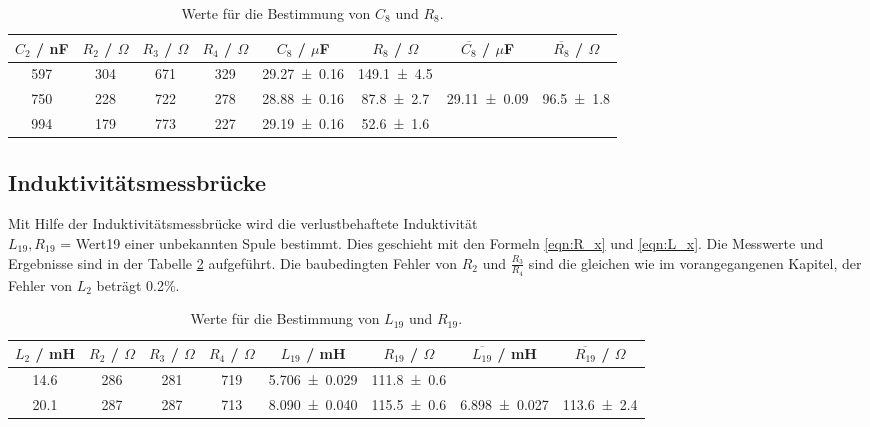 \begin{table}[H] %
  \centering
  \begin{tabular}{c c c c c c c c}
    \toprule
    $C_2$ / nF & $R_2$ / $\Omega$ & $R_3$ / $\Omega$ & $R_4$ / $\Omega$ & $C_8$ / $\mu$F & $R_8$ / $\Omega$ & $\overline{C_8}$ / $\mu$F & $\overline{R_8}$ / $\Omega$ \\
    \midrule
    597 & 304 & 671 & 329 & \num{29.27 +- 0.16} & \num{149.1 +- 4.5} & & \\
    750 & 228 & 722 & 278 & \num{28.88 +- 0.16} & \num{87.8 +- 2.7} & \num{29.11 +- 0.09} & \num{96.5 +- 1.8} \\
    994 & 179 & 773 & 227 & \num{29.19 +- 0.16} & \num{52.6 +- 1.6} & & \\
  \end{tabular}
  \caption{Werte für die Bestimmung von $C_8$ und $R_8$.}
  \label{tab:Kapa3}
\end{table}

\subsection{Induktivitätsmessbrücke}
\label{sec:Induk}
Mit Hilfe der Induktivitätsmessbrücke wird die verlustbehaftete Induktivität \\ $L_{19}, R_{19}$ = Wert19 einer unbekannten Spule bestimmt. Dies geschieht mit den Formeln \ref{eqn:R_x} und \ref{eqn:L_x}. Die Messwerte und Ergebnisse sind in der Tabelle \ref{tab:Induk1} aufgeführt. Die baubedingten Fehler von $R_2$ und $\frac{R_3}{R_4}$ sind die gleichen wie im vorangegangenen Kapitel, der Fehler von $L_2$ beträgt 0.2\%.

\begin{table}[H] %
  \centering
  \begin{tabular}{c c c c c c c c}
    \toprule
    $L_2$ / mH & $R_2$ / $\Omega$ & $R_3$ / $\Omega$ & $R_4$ / $\Omega$ & $L_{19}$ / mH & $R_{19}$ / $\Omega$ & $\overline{L_{19}}$ / mH & $\overline{R_{19}}$ / $\Omega$ \\
    \midrule
    14.6 & 286 & 281 & 719 & \num{5.706 +- 0.029} & \num{111.8 +- 0.6} & & \\
    20.1 & 287 & 287 & 713 & \num{8.090 +- 0.040} & \num{115.5 +- 0.6} & \num{6.898 +- 0.027} & \num{113.6 +- 2.4} \\
  \end{tabular}
  \caption{Werte für die Bestimmung von $L_{19}$ und $R_{19}$.}
  \label{tab:Induk1}
\end{table}

